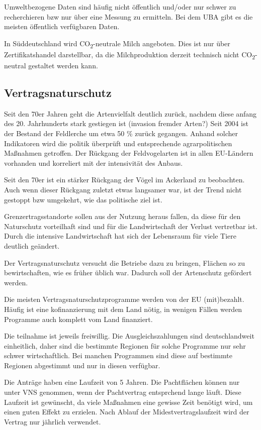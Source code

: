\documentclass[11pt]{scrbook}
\begin{document}
Umweltbezogene Daten sind häufig nicht öffentlich und/oder nur schwer zu recherchieren bzw nur über eine Messung zu ermitteln.
Bei dem \ac{UBA} gibt es die meisten öffentlich verfügbaren Daten.

In Süddeutschland wird CO\textsubscript{2}-neutrale Milch angeboten.
Dies ist nur über Zertifikatshandel darstellbar, da die Milchproduktion derzeit technisch nicht CO\textsubscript{2}-neutral gestaltet werden kann.

 \subsection{Vertragsnaturschutz}
 Seit den 70er Jahren geht die Artenvielfalt deutlich zurück, nachdem diese anfang des 20. Jahrhunderts stark gestiegen ist (invasion fremder Arten?)
 Seit 2004 ist der Bestand der Feldlerche um etwa 50 \% zurück gegangen.
 Anhand solcher Indikatoren wird die politik überprüft und entsprechende agrarpolitischen Maßnahmen getroffen.
 Der Rückgang der Feldvogelarten ist in allen \ac{EU}-Ländern vorhanden und korreliert mit der intensivität des Anbaus.

 Seit den 70er ist ein stärker Rückgang der Vögel im Ackerland zu beobachten.
 Auch wenn dieser Rückgang zuletzt etwas langsamer war, ist der Trend nicht gestoppt bzw umgekehrt, wie das politische ziel ist.

Grenzertragsstandorte sollen aus der Nutzung heraus fallen, da diese für den Naturschutz vorteilhaft sind und für die Landwirtschaft der Verlust vertretbar ist.
Durch die intensive Landwirtschaft hat sich der Lebensraum für viele Tiere deutlich geändert.

Der Vertragsnaturschutz versucht die Betriebe dazu zu bringen, Flächen so zu bewirtschaften, wie es früher üblich war.
Dadurch soll der Artenschutz gefördert werden.

Die meisten Vertragsnaturschutzprogramme werden von der \ac{EU} (mit)bezahlt.
Häufig ist eine kofinanzierung mit dem Land nötig, in wenigen Fällen werden Programme auch komplett vom Land finanziert.

Die teilnahme ist jeweils freiwillig.
Die Ausgleichszahlungen sind deutschlandweit einheitlich, daher sind die bestimmte Regionen für solche Programme nur sehr schwer wirtschaftlich.
Bei manchen Programmen sind diese auf bestimmte Regionen abgestimmt und nur in diesen verfügbar.

Die Anträge haben eine Laufzeit von 5 Jahren.
Die Pachtflächen können nur unter \ac{VNS} genommen, wenn der Pachtvertrag entsprchend lange läuft.
Diese Laufzeit ist gewünscht, da viele Maßnahmen eine gewisse Zeit benötigt wird, um einen guten Effekt zu erzielen.
Nach Ablauf der Midestvertragslaufzeit wird der Vertrag nur jährlich verwendet.
\end{document}

